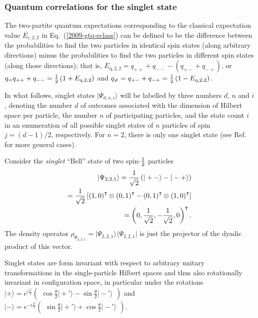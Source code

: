 \subsubsection{Quantum correlations for the singlet state}

The two-partite quantum expectations corresponding to the classical expectation value
$E_{\text{c},2,2}$ in Eq.~(\ref{2009-gtq-eclass})
can be defined to be the difference between the probabilities to
find the two particles in identical spin states (along arbitrary directions)
minus
the probabilities to
find the two particles in different spin states (along those directions);
that is,
$E_{\text{q},2,2}= q_{++} +q_{--} - (q_{+-} +q_{-+})$, or
$ q_{=} q_{++} +q_{--} =
{1\over2}\left(1 + E_{\text{q},2,2}  \right)
$
and
$
q_{\neq} =q_{+-} +q_{-+} =
{1\over2}\left(1 - E_{\text{q},2,2}  \right)
$.


In what follows, singlet states $\vert \Psi_{d,n,i} \rangle$ will be labelled by three numbers $d$, $n$ and $i$,
denoting
the number $d$ of outcomes associated with the dimension of Hilbert space per particle,
the number $n$ of participating particles,
and the state count $i$ in an enumeration of all possible singlet states of $n$ particles of spin $j=(d-1)/2$, respectively.
For $n=2$, there is only one singlet state
(see Ref.~\cite{schimpf-svozil} for more general cases).

Consider the {\em singlet} ``Bell'' state of two spin-${1\over 2}$
particles
\begin{equation}
\begin{split}
\vert \Psi_{2,2,1} \rangle
=
 {1\over \sqrt{2}}
\left(
\vert +- \rangle -
\vert -+ \rangle
\right)    \\
= {1\over \sqrt{2}}\left[ \left(1,0\right)^\intercal \otimes \left(0,1\right)^\intercal
- \left(0,1\right)^\intercal  \otimes \left(1,0\right)^\intercal \right]  \\
=\left( 0,\frac{1}{\sqrt{2}},- \frac{1}{\sqrt{2}} ,  0 \right)^\intercal
.
\end{split}  \label{2009-gtq-s1s21}
\end{equation}
The density operator $\rho_{\Psi_{2,2,1}} = \vert \Psi_{2,2,1} \rangle  \langle  \Psi_{2,2,1} \vert$
is just the projector of the dyadic product of this vector.


Singlet states are form invariant with respect to arbitrary unitary
transformations in the single-particle Hilbert spaces and thus
also rotationally invariant in configuration space,
in particular under the rotations~\cite[Eq.~(7--49)]{ba-89}
$
\vert + \rangle =
e^{ i{\frac{\varphi}{2}} }
\begin{pmatrix}
\cos \frac{\theta}{2} \vert +'  \rangle
-
\sin \frac{\theta}{2} \vert -'   \rangle
\end{pmatrix}
$
and
$
\vert - \rangle =
e^{ -i{\frac{\varphi}{2}} }
\begin{pmatrix}
\sin \frac{\theta}{2} \vert +'   \rangle
+
\cos \frac{\theta}{2} \vert -'  \rangle
\end{pmatrix}
$.

